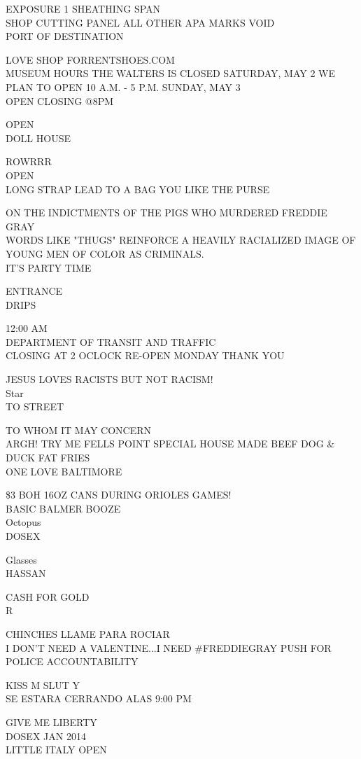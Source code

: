 \documentclass[10pt,letterpaper]{article}
\begin{document}
EXPOSURE 1 SHEATHING SPAN\\
SHOP CUTTING PANEL ALL OTHER APA MARKS VOID\\
PORT OF DESTINATION

LOVE SHOP FORRENTSHOES.COM\\
MUSEUM HOURS THE WALTERS IS CLOSED SATURDAY, MAY 2 WE PLAN TO OPEN 10 A.M. {-} 5 P.M. SUNDAY, MAY 3\\
OPEN CLOSING @8PM

OPEN\\
DOLL HOUSE

ROWRRR\\
OPEN\\
LONG STRAP LEAD TO A BAG YOU LIKE THE PURSE

ON THE INDICTMENTS OF THE PIGS WHO MURDERED FREDDIE GRAY\\
WORDS LIKE "THUGS" REINFORCE A HEAVILY RACIALIZED IMAGE OF YOUNG MEN OF COLOR AS CRIMINALS.\\
IT'S PARTY TIME

ENTRANCE\\
DRIPS

12:00 AM\\
DEPARTMENT OF TRANSIT AND TRAFFIC\\
CLOSING AT 2 OCLOCK RE{-}OPEN MONDAY THANK YOU

JESUS LOVES RACISTS BUT NOT RACISM!\\
Star\\
TO STREET

TO WHOM IT MAY CONCERN\\
ARGH!  TRY ME FELLS POINT SPECIAL HOUSE MADE BEEF DOG \& DUCK FAT FRIES\\
ONE LOVE BALTIMORE

\$3 BOH 16OZ CANS DURING ORIOLES GAMES!\\
BASIC BALMER BOOZE\\
Octopus\\
DOSEX

Glasses\\
HASSAN

CASH FOR GOLD\\
R

CHINCHES LLAME PARA ROCIAR\\
I DON'T NEED A VALENTINE...I NEED \#FREDDIEGRAY PUSH FOR POLICE ACCOUNTABILITY

KISS M SLUT Y\\
SE ESTARA CERRANDO ALAS 9:00 PM

GIVE ME LIBERTY\\
DOSEX JAN 2014\\
LITTLE ITALY OPEN
\end{document}
